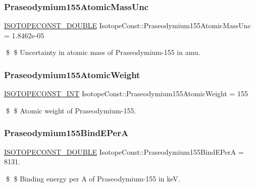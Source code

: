 \subsubsection{\texorpdfstring{Praseodymium155\+Atomic\+Mass\+Unc}{Praseodymium155AtomicMassUnc}}
{\footnotesize\ttfamily \mbox{\hyperlink{group___isotope_const-_macros_ga8f45a7272ce02c0b4c65c44636ed719a}{I\+S\+O\+T\+O\+P\+E\+C\+O\+N\+S\+T\+\_\+\+D\+O\+U\+B\+LE}} Isotope\+Const\+::\+Praseodymium155\+Atomic\+Mass\+Unc = 1.\+8462e-\/05}

\$ \$ Uncertainty in atomic mass of Praseodymium-\/155 in amu. \mbox{\label{group___isotope_const-_praseodymium-_pr155_ga8b2636f8ac1cb66f9327cebd589e2007}} 
\subsubsection{\texorpdfstring{Praseodymium155\+Atomic\+Weight}{Praseodymium155AtomicWeight}}
{\footnotesize\ttfamily \mbox{\hyperlink{group___isotope_const-_macros_ga5f18360b3e99483a35c32d789e62621c}{I\+S\+O\+T\+O\+P\+E\+C\+O\+N\+S\+T\+\_\+\+I\+NT}} Isotope\+Const\+::\+Praseodymium155\+Atomic\+Weight = 155}

\$ \$ Atomic weight of Praseodymium-\/155. \mbox{\label{group___isotope_const-_praseodymium-_pr155_ga6c060ed184d9c171886af34735df3bba}} 
\subsubsection{\texorpdfstring{Praseodymium155\+Bind\+E\+PerA}{Praseodymium155BindEPerA}}
{\footnotesize\ttfamily \mbox{\hyperlink{group___isotope_const-_macros_ga8f45a7272ce02c0b4c65c44636ed719a}{I\+S\+O\+T\+O\+P\+E\+C\+O\+N\+S\+T\+\_\+\+D\+O\+U\+B\+LE}} Isotope\+Const\+::\+Praseodymium155\+Bind\+E\+PerA = 8131.}

\$ \$ Binding energy per A of Praseodymium-\/155 in keV. \mbox{\label{group___isotope_const-_praseodymium-_pr155_ga792f5da38d32170bae134ca786190a64}} 
